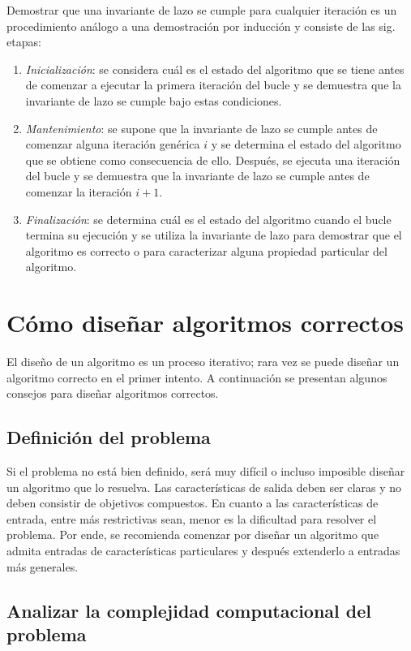Demostrar que una invariante de lazo se cumple para cualquier iteración
es un procedimiento análogo a una demostración por inducción y consiste
de las sig. etapas: 
\begin{enumerate}
\item \emph{Inicialización}: se considera cuál es el estado del algoritmo
que se tiene antes de comenzar a ejecutar la primera iteración\emph{
}del bucle y se demuestra que la invariante de lazo se cumple bajo
estas condiciones.
\item \emph{Mantenimiento}: se supone que la invariante de lazo se cumple
antes de comenzar alguna iteración genérica $i$ y se determina el
estado del algoritmo que se obtiene como consecuencia de ello. Después,
se ejecuta una iteración del bucle y se demuestra que la invariante
de lazo se cumple antes de comenzar la iteración $i+1$.
\item \emph{Finalización}: se determina cuál es el estado del algoritmo
cuando el bucle termina su ejecución y se utiliza la invariante de
lazo para demostrar que el algoritmo es correcto o para caracterizar
alguna propiedad particular del algoritmo. 
\end{enumerate}

\section{Cómo diseñar algoritmos correctos}

El diseño de un algoritmo es un proceso iterativo; rara vez se puede
diseñar un algoritmo correcto en el primer intento. A continuación
se presentan algunos consejos para diseñar algoritmos correctos. 

\subsection{Definición del problema}

Si el problema no está bien definido, será muy difícil o incluso imposible
diseñar un algoritmo que lo resuelva. Las características de salida
deben ser claras y no deben consistir de objetivos compuestos. En
cuanto a las características de entrada, entre más restrictivas sean,
menor es la dificultad para resolver el problema. Por ende, se recomienda
comenzar por diseñar un algoritmo que admita entradas de características
particulares y después extenderlo a entradas más generales.

\subsection{Analizar la complejidad computacional del problema}

